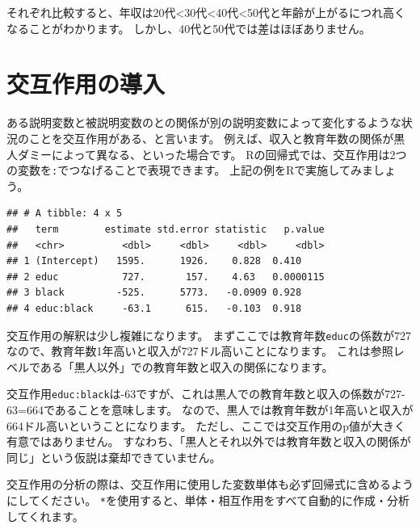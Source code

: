 \documentclass[]{book}
\newenvironment{Shaded}{\begin{snugshade}}{\end{snugshade}}
\newcommand{\KeywordTok}[1]{\textcolor[rgb]{0.13,0.29,0.53}{\textbf{#1}}}
\newcommand{\DataTypeTok}[1]{\textcolor[rgb]{0.13,0.29,0.53}{#1}}
\newcommand{\StringTok}[1]{\textcolor[rgb]{0.31,0.60,0.02}{#1}}
\newcommand{\OperatorTok}[1]{\textcolor[rgb]{0.81,0.36,0.00}{\textbf{#1}}}
\newcommand{\NormalTok}[1]{#1}
\begin{document}
それぞれ比較すると、年収は20代\textless{}30代\textless{}40代\textless{}50代と年齢が上がるにつれ高くなることがわかります。
しかし、40代と50代では差はほぼありません。

\section{交互作用の導入}\label{ux4ea4ux4e92ux4f5cux7528ux306eux5c0eux5165}

ある説明変数と被説明変数のとの関係が別の説明変数によって変化するような状況のことを交互作用がある、と言います。
例えば、収入と教育年数の関係が黒人ダミーによって異なる、といった場合です。
Rの回帰式では、交互作用は2つの変数を\texttt{:}でつなげることで表現できます。
上記の例をRで実施してみましょう。

\begin{Shaded}
\end{Shaded}

\begin{verbatim}
## # A tibble: 4 x 5
##   term        estimate std.error statistic   p.value
##   <chr>          <dbl>     <dbl>     <dbl>     <dbl>
## 1 (Intercept)   1595.      1926.    0.828  0.410    
## 2 educ           727.       157.    4.63   0.0000115
## 3 black         -525.      5773.   -0.0909 0.928    
## 4 educ:black     -63.1      615.   -0.103  0.918
\end{verbatim}

交互作用の解釈は少し複雑になります。
まずここでは教育年数\texttt{educ}の係数が727なので、教育年数1年高いと収入が727ドル高いことになります。
これは参照レベルである「黒人以外」での教育年数と収入の関係になります。

交互作用\texttt{educ:black}は-63ですが、これは黒人での教育年数と収入の係数が727-63=664であることを意味します。
なので、黒人では教育年数が1年高いと収入が664ドル高いということになります。
ただし、ここでは交互作用のp値が大きく有意ではありません。
すなわち、「黒人とそれ以外では教育年数と収入の関係が同じ」という仮説は棄却できていません。

交互作用の分析の際は、交互作用に使用した変数単体も必ず回帰式に含めるようにしてください。
\texttt{*}を使用すると、単体・相互作用をすべて自動的に作成・分析してくれます。
\end{document}
